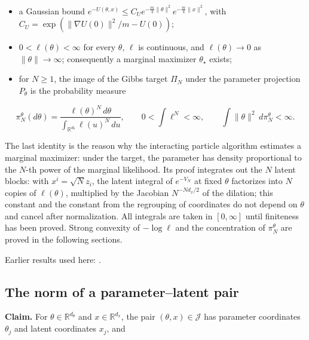 \documentclass[11pt,a4paper]{report}
\begin{document}
\begin{itemize}


\item a Gaussian bound \(e^{-U(\theta,x)}\le C_Ue^{-\frac m4\|\theta\|^2}e^{-\frac m4\|x\|^2}\), with \(C_U=\exp(\|\nabla U(0)\|^2/m-U(0))\);

\item \(0<\ell(\theta)<\infty\) for every \(\theta\), \(\ell\) is continuous, and \(\ell(\theta)\to0\) as \(\|\theta\|\to\infty\); consequently a marginal maximizer \(\theta_\star\) exists;

\item for \(N\ge1\), the image of the Gibbs target \(\Pi_N\) under the parameter projection \(P_\theta\) is the probability measure

\end{itemize}

\[\pi_N^\theta(d\theta)=\frac{\ell(\theta)^N\,d\theta}{\int_{\mathbb R^{d_\theta}}\ell(u)^N\,du},\qquad0<\int\ell^N<\infty,\qquad\int\|\theta\|^2\,d\pi_N^\theta<\infty .\]


The last identity is the reason why the interacting particle algorithm estimates a marginal maximizer: under the target, the parameter has density proportional to the \(N\)-th power of the marginal likelihood. Its proof integrates out the \(N\) latent blocks: with \(x^i=\sqrt Nz_i\), the latent integral of \(e^{-V_N}\) at fixed \(\theta\) factorizes into \(N\) copies of \(\ell(\theta)\), multiplied by the Jacobian \(N^{-Nd_x/2}\) of the dilation; this constant and the constant from the regrouping of coordinates do not depend on \(\theta\) and cancel after normalization. All integrals are taken in \([0,\infty]\) until finiteness has been proved. Strong convexity of \(-\log\ell\) and the concentration of \(\pi_N^\theta\) are proved in the following sections.



Earlier results used here: \cite[Section~3.26]{LangevinLean2026ULASC}.
\subsection{\texorpdfstring{The norm of a parameter–latent pair}{The norm of a parameter–latent pair}}
\label{report-step-IPLA-MarginalConcentration-lean-1}


\textbf{Claim.} For \(\theta\in\mathbb R^{d_\theta}\) and \(x\in\mathbb R^{d_x}\), the pair \((\theta,x)\in\mathcal J\) has parameter coordinates \(\theta_j\) and latent coordinates \(x_j\), and
\end{document}
